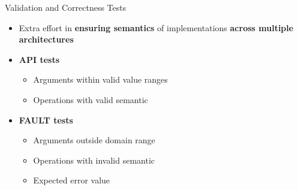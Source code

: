 

		\begin{frame}[fragile]{Validation and Correctness Tests}

			\begin{itemize}
				\item Extra effort in \textbf{ensuring semantics} of implementations \textbf{across multiple architectures}
			\end{itemize}

			\begin{itemize}
				\item \textbf{API tests}
				\begin{itemize}
					\item Arguments within valid value ranges
					\item Operations with valid semantic
				\end{itemize}
			\end{itemize}

			\begin{itemize}
				\item \textbf{FAULT tests}
				\begin{itemize}
					\item Arguments outside domain range
					\item Operations with invalid semantic
					\item Expected error value
				\end{itemize}
			\end{itemize}

		\end{frame}

